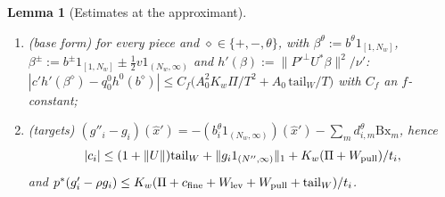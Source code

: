 \documentclass[10pt]{amsart}
\newtheorem{lemma}[theorem]{Lemma}
\theoremstyle{definition}
\theoremstyle{remark}
\begin{document}
\begin{lemma}[Estimates at the approximant]
\begin{enumerate}
satisfies $\mathfrak S_m\le K_w\Pi^2\log(e/\Pi)+4m\big(C_S(K_w\Pi)^2+s_1^2T^4\big)
+4(W_{\rm lev}+W_{\rm pull})$;
\item[(f)] \textup{(base form)} for every piece and $\diamond\in\{+,-,\theta\}$,
with $\beta^\theta:=b^\theta1_{[1,N_w]}$, $\beta^\pm:=b^\pm1_{[1,N_w]}\pm
\frac12v1_{(N_w,\infty)}$ and $h'(\beta):=\|P'^\perp U^*\beta\|^2/\nu'$:
$|c'h'(\beta^\diamond)-q^0_0h^0(b^\diamond)|\le C_f\big(A_0^2K_w\Pi/T^2+A_0\,\mathrm{tail}_W/T\big)$ with $C_f$ an $f$-constant;
\item[(g)] \textup{(targets)} $(g''_i-g_i)(\hat x')=-(b^\theta_i1_{(N_w,\infty)})
(\hat x')-\sum_md^\theta_{i,m}\mathrm{Bx}_m$, hence
\[
 |c_i|\le(1+\|U\|)\mathrm{tail}_W+\|g_i1_{(N'',\infty)}\|_1+K_w(\Pi+W_{\rm pull})
 /t_i,
\]
and $p^*(g'_i-\rho g_i)\le K_w(\Pi+c_{\rm fine}+W_{\rm lev}+W_{\rm pull}+
\mathrm{tail}_W)/t_i$.
\end{enumerate}
\end{lemma}
\end{document}
